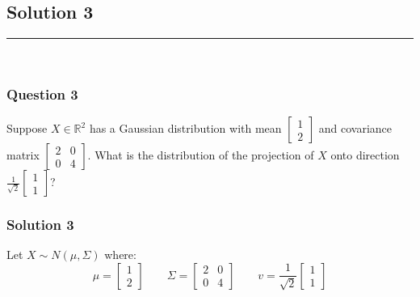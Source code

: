 \documentclass{article}
\begin{document}
\newpage

\subsection*{Solution 3}
\noindent\rule{\textwidth}{0.4pt}\\
\subsubsection*{Question 3}
\begin{flushleft}
    Suppose $X \in \mathbb{R}^2$ has a Gaussian distribution with mean $\begin{bmatrix}1 \\ 2\end{bmatrix}$ and covariance matrix $\begin{bmatrix}2 & 0 \\ 0 & 4\end{bmatrix}$. 
    What is the distribution of the projection of $X$ onto direction $\frac{1}{\sqrt{2}}\begin{bmatrix}1 \\ 1\end{bmatrix}$? 
\end{flushleft}

\subsubsection*{Solution 3}
Let $X \sim N(\mu, \Sigma)$ where:
$$ \mu = \begin{bmatrix}1 \\ 2\end{bmatrix} \quad \quad \Sigma = \begin{bmatrix}2 & 0 \\ 0 & 4\end{bmatrix} \quad \quad v = \frac{1}{\sqrt{2}}\begin{bmatrix}1 \\ 1\end{bmatrix}$$
\end{document}
